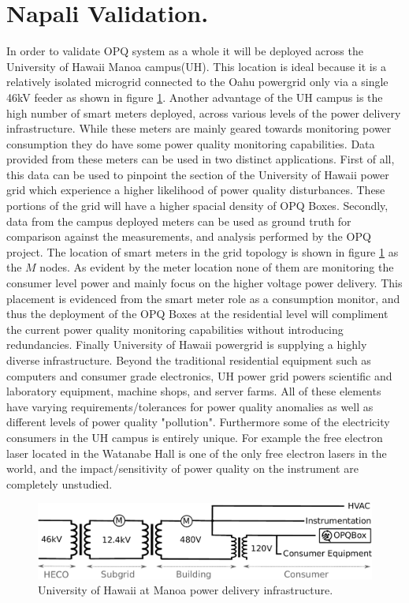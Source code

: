 \section{Napali Validation.}
In order to validate OPQ system as a whole it will be deployed across the University of Hawaii Manoa campus(UH). This location is ideal because it is a relatively isolated microgrid connected to the Oahu powergrid only via a single 46kV feeder as shown in figure \ref{expdes:fig:1}. Another advantage of the UH campus is the high number of smart meters deployed, across various levels of the power delivery infrastructure. While these meters are mainly geared towards monitoring power consumption they do have some power quality monitoring capabilities. Data provided from these meters can be used in two distinct applications. First of all, this data can be used to pinpoint the section of the University of Hawaii power grid which experience a higher likelihood of power quality disturbances. These portions of the grid will have a higher spacial density of OPQ Boxes. Secondly, data from the campus deployed meters can be used as ground truth for comparison against the measurements, and analysis performed by the OPQ project. The location of smart meters in the grid topology is shown in figure \ref{expdes:fig:1} as the $M$ nodes. As evident by the meter location none of them are monitoring the consumer level power and mainly focus on the higher voltage power delivery. This placement is evidenced from the smart meter role as a consumption monitor, and thus the deployment of the OPQ Boxes at the residential level will compliment the current power quality monitoring capabilities without introducing redundancies. Finally University of Hawaii powergrid is supplying a highly diverse infrastructure. Beyond the traditional residential equipment such as computers and consumer grade electronics, UH power grid powers scientific and laboratory equipment, machine shops, and server farms. All of these elements have varying requirements/tolerances for power quality anomalies as well as different levels of power quality "pollution". Furthermore some of the electricity consumers in the UH campus is entirely unique. For example the free electron laser located in the Watanabe Hall is one of the only free electron lasers in the world, and the impact/sensitivity of power quality on the instrument are completely unstudied.
\begin{figure}[h]
	\centering
	\includegraphics[width=1\linewidth]{img/uh-grid.pdf}	
	\caption{University of Hawaii at Manoa power delivery infrastructure.}
	\label{expdes:fig:1}
\end{figure}
